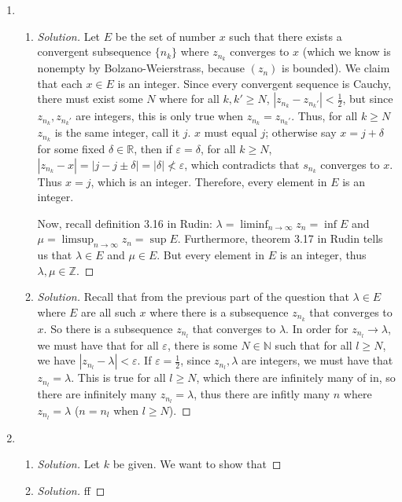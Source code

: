 \documentclass{article}
\newcommand{\N}{{\mathbb N}}
\newcommand{\Z}{{\mathbb Z}}
\newcommand{\R}{{\mathbb R}}
\newcommand{\ep}{{\varepsilon}}
\begin{document}
\begin{enumerate}
	\item
	\begin{enumerate}
		\item \begin{proof}[Solution]\let\qed\relax
			Let $E$ be the set of number $x$ such that
			there exists a convergent subsequence $\{n_k\}$ where
			$z_{n_k}$ converges to $x$
			(which we know is nonempty by Bolzano-Weierstrass,
			because $(z_n)$ is bounded).
			We claim that each $x \in E$ is an integer.
			Since every convergent sequence is Cauchy,
			there must exist some $N$ where for all $k,k' \geq N$,
			$|z_{n_k} - z_{n_k'}| < \frac{1}{2}$,
			but since $z_{n_k}, z_{n_k'}$ are integers,
			this is only true when $z_{n_k} = z_{n_k'}$.
			Thus, for all $k \geq N$ $z_{n_k}$ is the same integer, call it $j$.
			$x$ must equal $j$;
			otherwise say $x = j + \delta$ for some fixed $\delta\in\R$,
			then if $\ep = \delta$, for all $k \geq N$,
			$|z_{n_k} - x| = |j - j \pm \delta| = |\delta| \not< \ep$,
			which contradicts that $s_{n_k}$ converges to $x$.
			Thus $x = j$, which is an integer.
			Therefore, every element in $E$ is an integer.

			Now, recall definition 3.16 in Rudin:
			$\lambda = \liminf_{n \to \infty}z_n = \inf{E}$ and
			$\mu = \limsup_{n\to\infty}z_n = \sup{E}$.
			Furthermore, theorem 3.17 in Rudin tells us that
			$\lambda \in E$ and $\mu \in E$.
			But every element in $E$ is an integer, thus
			$\lambda,\mu \in \Z$.
		\end{proof}
		\item \begin{proof}[Solution]\let\qed\relax
			Recall that from the previous part of the question
			that $\lambda \in E$ where $E$
			are all such $x$ where there is a subsequence
			$z_{n_k}$ that converges to $x$.
			So there is a subsequence $z_{n_l}$
			that converges to $\lambda$.
			In order for $z_{n_l} \to \lambda$,
			we must have that for all $\ep$,
			there is some $N\in\N$ such that for all $l \geq N$,
			we have $|z_{n_l} - \lambda| < \ep$.
			If $\ep = \frac{1}{2}$,
			since $z_{n_l}, \lambda$ are integers,
			we must have that $z_{n_l} = \lambda$.
			This is true for all $l \geq N$,
			which there are infinitely many of in,
			so there are infinitely many $z_{n_l} = \lambda$,
			thus there are infitly many $n$ where $z_{n_l} = \lambda$
			($n = n_l$ when $l \geq N$).
		\end{proof}
	\end{enumerate}
	\item
	\begin{enumerate}
		\item \begin{proof}[Solution]\let\qed\relax
			Let $k$ be given.
			We want to show that 
		\end{proof}
		\item \begin{proof}[Solution]\let\qed\relax
			ff
		\end{proof}
	\end{enumerate}
\end{enumerate}
\clearpage
\end{document}
